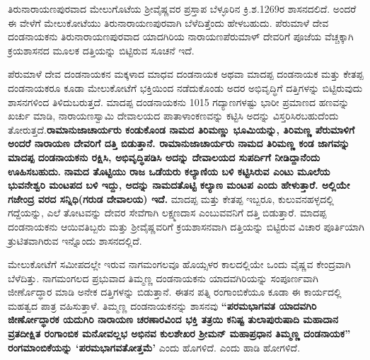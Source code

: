ತಿರುನಾರಾಯಣಪುರವಾದ ಮೇಲುಗೊಟೆಯ ಶ‍್ರೀವೈಷ್ಣವರ ಪ್ರಸ್ತಾಪ ಬೆಳ್ಳೂರಿನ ಕ್ರಿ.ಶ.1269ರ ಶಾಸನದಲಿದೆ. ಅಂದರೆ ಈ ವೇಳೆಗೆ ಮೇಲುಕೋಟೆಯು ತಿರುನಾರಾಯಣಪುರವಾಗಿ ಬೆಳೆದಿತ್ತೆಂದು ಹೇಳಬಹುದು. ಪೆರುಮಾಳೆ ದೇವ ದಂಡನಾಯಕನು ತಿರುನಾರಾಯಣಪುರವಾದ ಯಾದಗಿರಿಯ ನಾರಾಯಣಪೆರುಮಾಳ್​ ದೇವರಿಗೆ ಪೂಜೆಯ ವೆಚ್ಚಕ್ಕಾಗಿ ಕ್ರಯಶಾಸನದ ಮೂಲಕ ದತ್ತಿಯನ್ನು ಬಿಟ್ಟಿರುವ ಸೂಚನೆ ಇದೆ.

ಪೆರುಮಾಳೆ ದೇವ ದಂಡನಾಯಕನ ಮಕ್ಕಳಾದ ಮಾಧವ ದಂಡನಾಯಕ ಅಥವಾ ಮಾದಪ್ಪ ದಂಡನಾಯಕ ಮತ್ತು ಕೇತಪ್ಪ ದಂಡನಾಯಕರೂ ಕೂಡಾ ಮೇಲುಕೋಟೆಗೆ ಭಕ್ತಿಯಿಂದ ನಡೆದುಕೊಂಡು ಅದರ ಅಭಿವೃದ್ಧಿಗೆ ದತ್ತಿಗಳನ್ನು ಬಿಟ್ಟಿರುವುದು ಶಾಸನಗಳಿಂದ ತಿಳಿದುಬರುತ್ತದೆ. ಮಾದಪ್ಪ ದಂಡನಾಯಕನು 1015 ಗದ್ಯಾಣಗಳಷ್ಟು ಭಾರೀ ಪ್ರಮಾಣದ ಹಣವನ್ನು ಖರ್ಚು ಮಾಡಿ, ನಾರಾಯಣಸ್ವಾಮಿ ದೇವಾಲಯದ ಪಾತಾಳಾಂಕಣವನ್ನು ಕಟ್ಟಿಸಿ ಅದನ್ನು ವಿಸ್ತರಿಸಿರಬಹುದೆಂದು ತೋರುತ್ತದೆ.\textbf{ರಾಮಾನುಜಾಚಾರ್ಯರು ಕಂಡುಕೊಂಡ ನಾಮದ ತಿರಿಮಣ್ಣು ಭೂಮಿಯನ್ನು, ತಿರಿಮಣ್ಣ ಪೆರುಮಾಳಿಗೆ ಅಂದರೆ ನಾರಾಯಣ ದೇವರಿಗೆ ದತ್ತಿ ಬಿಡುತ್ತಾನೆ. ರಾಮಾನುಜಾಚಾರ್ಯರು ನಾಮದ ತಿರಿಮಣ್ಣ ಕಂಡ ಜಾಗವನ್ನು ಮಾದಪ್ಪ ದಂಡನಾಯಕನು ರಕ್ಷಿಸಿ, ಅಭಿವೃದ್ಧಿಪಡಿಸಿ ಅದನ್ನು ದೇವಾಲಯದ ಸುಪರ್ದಿಗೆ ನೀಡಿದ್ದಾನೆಂದು ಊಹಿಸಬಹುದು.} \textbf{ನಾಮದ ತೊಟ್ಟಿಯು ರಾಜ ಒಡೆಯರು ಕಲ್ಯಾಣಿಯ ಬಳಿ ಕಟ್ಟಿಸಿರುವ ಎಂಟು ಮೂಲೆಯ ಭುವನೇಶ್ವರಿ ಮಂಟಪದ ಬಳಿ ಇದ್ದು, ಅದನ್ನು ನಾಮದತೊಟ್ಟಿ ಕಲ್ಯಾಣ ಮಂಟಪ ಎಂದು ಹೇಳುತ್ತಾರೆ. ಅಲ್ಲಿಯೇ ಗಜೇಂದ್ರ ವರದ ಸನ್ನಿಧಿ(ಗರುಡ ದೇವಾಲಯ) ಇದೆ. } ಮಾದಪ್ಪ ಮತ್ತು ಕೇತಪ್ಪ ಇಬ್ಬರೂ, ಕುಲುವನಹಳ್ಳದಲ್ಲಿ ಗದ್ದೆಯನ್ನು, ಎಲೆ ತೋಟವನ್ನು ದೇವರ ಸೇವೆಗಾಗಿ ಲಕ್ಷ್ಮಣದಾಸ ಎಂಬುವವನಿಗೆ ದತ್ತಿ ಬಿಡುತ್ತಾರೆ. ಮಾದಪ್ಪ ದಂಡನಾಯಕನು ಆಯಿವತಿಬ್ಬರು ಮತ್ತು ಶ‍್ರೀವೈಷ್ಣವರಿಗೆ ಕ್ರಯಶಾಸನವಾಗಿ ದತ್ತಿಯನ್ನು ಬಿಟ್ಟಿರುವ ವಿಚಾರ ಪೂರ್ತಿಯಾಗಿ ತ್ರುಟಿತವಾಗಿರುವ ಇನ್ನೊಂದು ಶಾಸನದಲ್ಲಿದೆ.

ಮೇಲುಕೋಟೆಗೆ ಸಮೀಪದಲ್ಲೇ ಇರುವ ನಾಗಮಂಗಲವೂ ಹೊಯ್ಸಳರ ಕಾಲದಲ್ಲಿಯೇ ಒಂದು ವೈಷ್ಣವ ಕೇಂದ್ರವಾಗಿ ಬೆಳೆದಿತ್ತು. ನಾಗಮಂಗಲದ ಪ್ರಭುವಾದ ತಿಮ್ಮಣ್ಣ ದಂಡನಾಯಕನು ಯಾದವಗಿರಿಯನ್ನು ಸಂಪೂರ್ಣವಾಗಿ ಜೀರ್ಣೊದ್ಧಾರ ಮಾಡಿ ಅನೇಕ ದತ್ತಿಗಳನ್ನು ಬಿಡುತ್ತಾನೆ. ಈತನ ಪತ್ನಿ ರಂಗಾಂಬಿಕೆಯೂ ಕೂಡಾ ಈ ಕಾರ್ಯದಲ್ಲಿ ಮಹತ್ವದ ಪಾತ್ರ ವಹಿಸುತ್ತಾಳೆ. ತಿಮ್ಮಣ್ಣ ದಂಡನಾಯಕನನ್ನು ಶಾಸನವು\textbf{ “ಪರಮಭಾಗವತ ಯಾದವಗಿರಿ ಜೀರ್ಣೋದ್ಧಾರಕ ಯದುಗಿರಿ ನಾರಾಯಣ ಚರಣಾರವಿಂದ ಭಕ್ತಿ ತತ್ರಯಿ ಕನಿಷ್ಟ ತುಲಾಪುರುಷಾದಿ ಮಹಾದಾನ ವ್ರತದೀಕ್ಷಿತ ರಂಗಾಂಬಿಕ ಮನೋವಲ್ಲಭ ಅಭಿನವ ಕುಲಶೇಖರ ಶ‍್ರೀಮನ್​ ಮಹಾಪ್ರಧಾನ ತಿಮ್ಮಣ್ಣ ದಂಡನಾಯಕ”} \textbf{ರಂಗಮಾಂಬಿಕೆಯನ್ನು ‘ಪರಮಭಾಗವತೋತ್ತಮೆ’} ಎಂದು ಹೊಗಳಿದೆ. ಎಂದು ಹಾಡಿ ಹೋಗಳಿದೆ.

